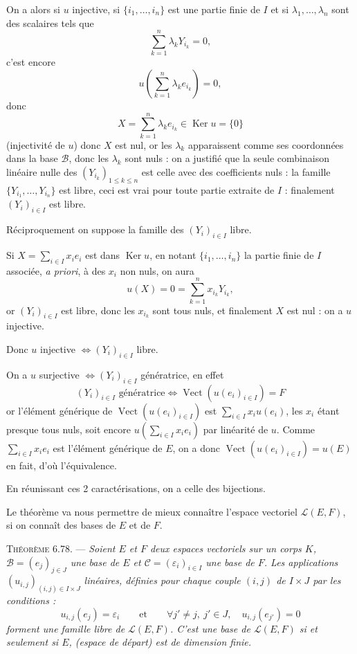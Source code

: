 On a alors si $u$ injective, si $\{i_1,\ldots,i_n\}$ est une partie finie de $I$ et si $\lambda_1,\ldots,\lambda_n$ sont des scalaires tels que
\[
\sum_{k=1}^n\lambda_kY_{i_k}=0,
\]
c'est encore
\[
u\left(\sum_{k=1}^n\lambda_ke_{i_k}\right)=0,
\]
donc
\[
X=\sum_{k=1}^n\lambda_ke_{i_k}\in\operatorname{Ker} u=\{0\}
\]
(injectivité de $u$) donc $X$ est nul, or les $\lambda_k$ apparaissent comme ses coordonnées dans la base $\mathcal B$, donc les $\lambda_k$ sont nuls : on a justifié que la seule combinaison linéaire nulle des $(Y_{i_k})_{1\le k\le n}$ est celle avec des coefficients nuls : la famille $\{Y_{i_1},\ldots,Y_{i_n}\}$ est libre, ceci est vrai pour toute partie extraite de $I$ : finalement $(Y_i)_{i\in I}$ est libre.

Réciproquement on suppose la famille des $(Y_i)_{i\in I}$ libre.

Si $X=\sum_{i\in I}x_i e_i$ est dans $\operatorname{Ker} u$, en notant $\{i_1,\ldots,i_n\}$ la partie finie de $I$ associée, \emph{a priori}, à des $x_i$ non nuls, on aura
\[
u(X)=0=\sum_{k=1}^n x_{i_k}Y_{i_k},
\]
or $(Y_i)_{i\in I}$ est libre, donc les $x_{i_k}$ sont tous nuls, et finalement $X$ est nul : on a $u$ injective.

Donc $u$ injective $\Longleftrightarrow (Y_i)_{i\in I}$ libre.

On a $u$ surjective $\Longleftrightarrow (Y_i)_{i\in I}$ génératrice, en effet
\[
(Y_i)_{i\in I}\text{ génératrice}\Longleftrightarrow \operatorname{Vect}(u(e_i)_{i\in I})=F
\]
or l'élément générique de $\operatorname{Vect}(u(e_i)_{i\in I})$ est $\sum_{i\in I}x_i u(e_i)$, les $x_i$ étant presque tous nuls, soit encore $u(\sum_{i\in I}x_i e_i)$ par linéarité de $u$. Comme $\sum_{i\in I}x_i e_i$ est l'élément générique de $E$, on a donc $\operatorname{Vect}(u(e_i)_{i\in I})=u(E)$ en fait, d'où l'équivalence.

En réunissant ces 2 caractérisations, on a celle des bijections.

Le théorème va nous permettre de mieux connaître l'espace vectoriel $\mathcal L(E,F)$, si on connaît des bases de $E$ et de $F$.

\medskip\noindent\textsc{Théorème 6.78.} --- \emph{Soient $E$ et $F$ deux espaces vectoriels sur un corps $K$, $\mathcal B=(e_j)_{j\in J}$ une base de $E$ et $\mathcal C=(\varepsilon_i)_{i\in I}$ une base de $F$. Les applications $(u_{i,j})_{(i,j)\in I\times J}$ linéaires, définies pour chaque couple $(i,j)$ de $I\times J$ par les conditions :
\[
u_{i,j}(e_j)=\varepsilon_i\qquad\text{et}\qquad \forall j'\ne j,\ j'\in J,\quad u_{i,j}(e_{j'})=0
\]
forment une famille libre de $\mathcal L(E,F)$. C'est une base de $\mathcal L(E,F)$ si et seulement si $E$, (espace de départ) est de dimension finie.}

